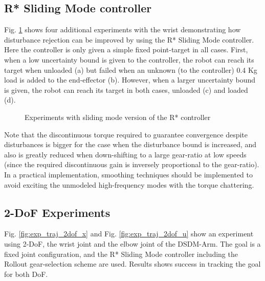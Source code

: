\subsection{R* Sliding Mode controller}

Fig. \ref{fig:rob} shows four additional experiments with the wrist demonstrating how disturbance rejection can be improved by using the  R* Sliding Mode controller. Here the controller is only given a simple fixed point-target in all cases. First, when a low uncertainty bound is given to the controller, the robot can reach its target when unloaded (a) but failed when an unknown (to the controller) 0.4 Kg load is added to the end-effector (b). However, when a larger uncertainty bound is given, the robot can reach its target in both cases, unloaded (c) and loaded (d). 

\begin{figure}[htp]
        \centering
				\hspace{-10pt}
				\hspace{-5pt}
				\hspace{-5pt}
				\hspace{-5pt}
        \caption{Experiments with sliding mode version of the R* controller }
				\label{fig:rob}
\end{figure}

Note that the discontinuous torque required to guarantee convergence despite disturbances is bigger for the case when the disturbance bound is increased, and also is greatly reduced when down-shifting to a large gear-ratio at low speeds (since the required discontinuous gain is inversely proportional to the gear-ratio). In a practical implementation, smoothing techniques should be implemented to avoid exciting the unmodeled high-frequency modes with the torque chattering.

\subsection{2-DoF Experiments}

Fig. \ref{fig:exp_traj_2dof_x} and Fig. \ref{fig:exp_traj_2dof_u} show an experiment using 2-DoF, the wrist joint and the elbow joint of the DSDM-Arm. The goal is a fixed joint configuration, and the R* Sliding Mode controller including the Rollout gear-selection scheme are used. Results shows success in tracking the goal for both DoF.

